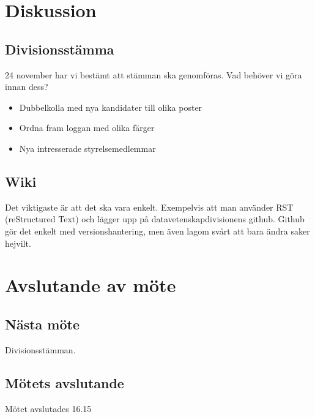 \documentclass[protokoll]{dvd}
\begin{document}



\section{Diskussion}

    \subsection{Divisionsstämma}
    24 november har vi bestämt att stämman ska genomföras. Vad behöver vi göra innan dess?

    \begin{itemize}
        \item Dubbelkolla med nya kandidater till olika poster
        \item Ordna fram loggan med olika färger
        \item Nya intresserade styrelsemedlemmar
    \end{itemize}

    \subsection{Wiki}
    Det viktigaste är att det ska vara enkelt. Exempelvis att man använder RST (reStructured Text) och lägger upp på datavetenskapdivisionens github.
    Github gör det enkelt med versionshantering, men även lagom svårt att bara ändra saker hejvilt.


\section{Avslutande av möte}


\subsection{Nästa möte}

Divisionsstämman.

\subsection{Mötets avslutande}

Mötet avslutades 16.15

\styrelsesignaturer
\end{document}

